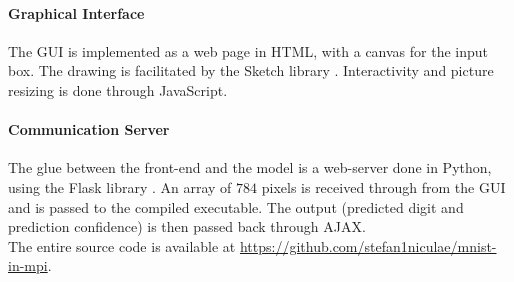 \documentclass[a4paper]{article}
\begin{document}
\paragraph{Graphical Interface} The GUI is implemented as a web page in HTML, with a canvas for the input box.
The drawing is facilitated by the Sketch library \cite{sketch}. Interactivity and picture resizing is done through JavaScript.

\paragraph{Communication Server} The glue between the front-end and the model is a web-server done in Python, using the Flask library \cite{flask}. An array of $784$ pixels is received through from the GUI and is passed to the compiled executable. The output (predicted digit and prediction confidence) is then passed back through AJAX.
\\

\noindent The entire source code is available at \url{https://github.com/stefan1niculae/mnist-in-mpi}.

\vspace{\fill} %

    
    
\end{document}
